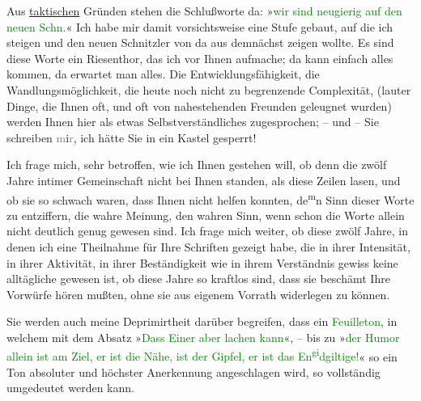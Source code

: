 \pstart
           Aus \uline{taktischen} Gründen stehen die Schlußworte da:
                  »\textcolor{green}{wir sind neugierig auf den
                  neuen Schn.}{}\ledrightnote{{$\rightarrow$}\textcolor{green}{Arthur Schnitzler und sein »Reigen«}}« Ich habe mir damit vorsichtsweise eine Stufe gebaut, auf die ich
               steigen und den neuen Schnitzler von da aus demnächst zeigen wollte. Es sind diese
               Worte ein Riesenthor, das ich vor Ihnen aufmache; da kann einfach alles kommen, da
               erwartet man alles. Die Entwicklungsfähigkeit, die Wandlungsmöglichkeit, die heute
               noch nicht zu begrenzende Complexität, (lauter Dinge, die Ihnen oft, und oft von
               nahestehenden Freunden geleugnet wurden) werden Ihnen hier als etwas
               Selbstverständliches zugesprochen; – und – Sie schreiben
                  \textcolor{gray}{m}i\textcolor{gray}{r}, ich hätte Sie in ein Kastel
               gesperrt!\pend
           
\pstart
           Ich frage mich, sehr betroffen, wie ich Ihnen gestehen will, ob denn die zwölf Jahre
               intimer Gemeinschaft nicht bei Ihnen standen, als \label{K_L03353-9v}\label{K_L03353-9h} diese Zeilen lasen, und ob sie so
               schwach waren,  dass \label{K_L03353-10v}\label{K_L03353-10h} Ihnen nicht helfen konnten, de\substVorne{}\textsuperscript{m}\substDazwischen{}n\substHinten{} Sinn dieser Worte zu entziffern, die wahre Meinung, den wahren Sinn, wenn
               schon die Worte allein nicht deutlich genug gewesen sind. Ich frage mich weiter, ob
               diese zwölf Jahre, in denen ich eine Theilnahme für Ihre Schriften gezeigt habe, die
               in ihrer Intensität, in ihrer Aktivität, in ihrer Beständigkeit wie in ihrem
               Verständnis gewiss keine alltägliche gewesen ist, ob diese Jahre so kraftlos sind,
               dass sie beschämt Ihre Vorwürfe hören mußten, ohne sie aus eigenem Vorrath widerlegen
               zu können.\pend
           
\pstart
           Sie werden auch meine Deprimirtheit darüber begreifen, dass ein \textcolor{green}{Feuilleton}{}\ledrightnote{{$\rightarrow$}\textcolor{green}{Arthur Schnitzler und sein »Reigen«}}, in welchem mit dem Absatz »\textcolor{green}{Dass Einer aber lachen kann}{}\ledrightnote{{$\rightarrow$}\textcolor{green}{Arthur Schnitzler und sein »Reigen«}}«, –
               bis zu »\textcolor{green}{der Humor allein ist am
                  Ziel, er ist die Nähe, ist der Gipfel, er ist das En\substVorne{}\textsuperscript{gi}\substDazwischen{}dg\substHinten{}iltige!}{}\ledrightnote{{$\rightarrow$}\textcolor{green}{Arthur Schnitzler und sein »Reigen«}}« so ein Ton absoluter und höchster Anerkennung angeschlagen
               wird, so vollständig umgedeutet werden kann.\pend
           
